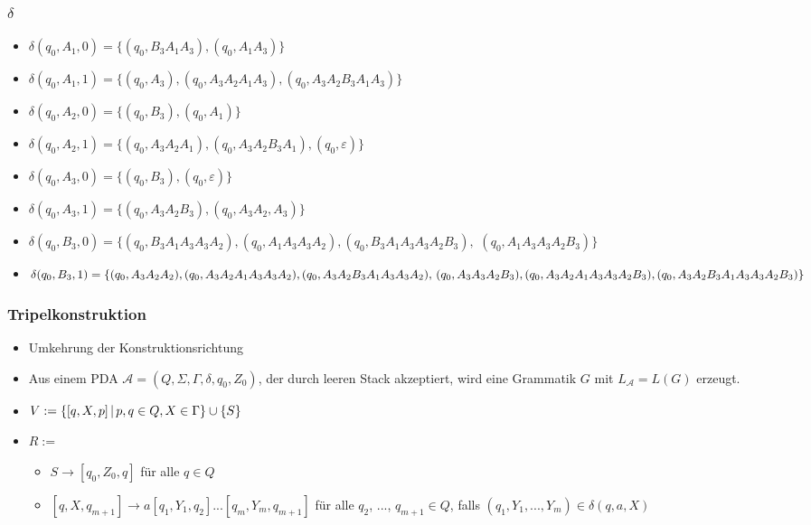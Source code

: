 \begin{frame}
 \frametitle{$\delta$}
\begin{itemize}
 \item \(\delta(q_0, A_1, 0) = \{ (q_0, B_3A_1A_3), (q_0, A_1A_3)\}\)
 \item \(\delta(q_0, A_1, 1) = \{(q_0, A_3), (q_0, A_3A_2A_1A_3), (q_0, A_3A_2B_3A_1A_3) \}\)
 \item \(\delta(q_0, A_2, 0) = \{(q_0, B_3), (q_0, A_1)\}\)
 \item \(\delta(q_0, A_2, 1) = \{(q_0, A_3A_2A_1), (q_0, A_3A_2B_3A_1), (q_0, \varepsilon)\}\)
 \item \(\delta(q_0, A_3, 0) = \{(q_0, B_3), (q_0, \varepsilon)\}\)
 \item \(\delta(q_0, A_3, 1) = \{(q_0, A_3A_2B_3), (q_0, A_3A_2, A_3)\}\)
 \item $\delta(q_0, B_3, 0) = \{(q_0, B_3A_1A_3A_3A_2), (q_0, A_1A_3A_3A_2), (q_0, B_3A_1A_3A_3A_2B_3),$ $ (q_0, A_1A_3A_3A_2B_3)\}$
 \item \(\delta(q_0, B_3, 1) = \{(q_0, A_3A_2A_2), (q_0, A_3A_2A_1A_3A_3A_2), (q_0, A_3A_2B_3A_1A_3A_3A_2),$ $
 (q_0, A_3A_3A_2B_3), (q_0, A_3A_2A_1A_3A_3A_2B_3), (q_0, A_3A_2B_3A_1A_3A_3A_2B_3)\}\)
\end{itemize}
\end{frame}

\begin{frame}
 \frametitle{Tripelkonstruktion}
 \begin{itemize}
  \item Umkehrung der Konstruktionsrichtung
  \item Aus einem PDA $\mathcal{A} = (Q, \Sigma, \Gamma, \delta, q_0, Z_0)$, der durch leeren Stack akzeptiert, wird eine Grammatik $G$ mit $L_{\mathcal{A}} = L(G)$ erzeugt.
 \end{itemize} 
 \begin{itemize}
  \item $V := \left\lbrace [q, X, p] \,\middle\vert\, p, q \in Q, X \in \Gamma \right\rbrace \cup \{S\}$
  \item $R := $
  \begin{itemize}
   \item $S \rightarrow [q_0, Z_0, q]$ für alle $q \in Q$
   \item $[q, X, q_{m+1}] \rightarrow a[q_1, Y_1, q_2] ... [q_m, Y_m, q_{m+1}]$ für alle $q_2$, ..., $q_{m+1} \in Q$,
   falls $(q_1, Y_1, ..., Y_m) \in \delta(q, a, X)$
  \end{itemize}
 \end{itemize}

\end{frame}

